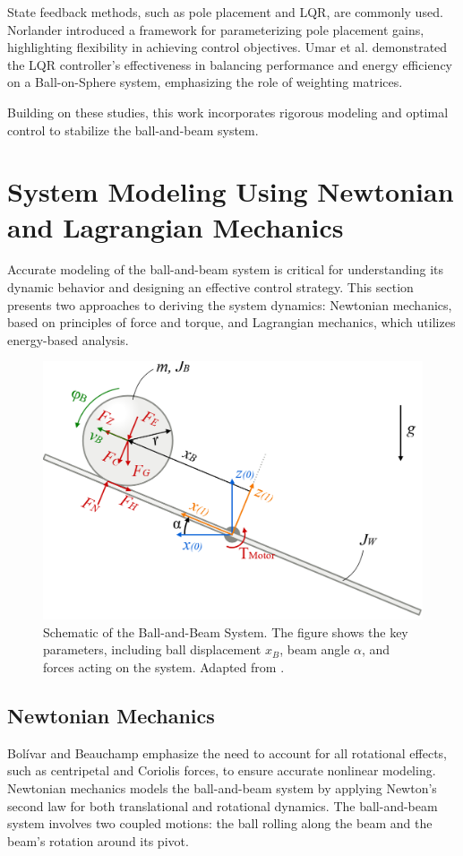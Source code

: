 \documentclass[conference]{IEEEtran}
\begin{document}
State feedback methods, such as pole placement and LQR, are commonly used. Norlander \cite{norlaner2003} introduced a framework for parameterizing pole placement gains, highlighting flexibility in achieving control objectives. Umar et al. \cite{umar2022} demonstrated the LQR controller's effectiveness in balancing performance and energy efficiency on a Ball-on-Sphere system, emphasizing the role of weighting matrices.

Building on these studies, this work incorporates rigorous modeling and optimal control to stabilize the ball-and-beam system.


\section{System Modeling Using Newtonian and Lagrangian Mechanics}
\label{sec:modeling}
Accurate modeling of the ball-and-beam system is critical for understanding its dynamic behavior and designing an effective control strategy. This section presents two approaches to deriving the system dynamics: Newtonian mechanics, based on principles of force and torque, and Lagrangian mechanics, which utilizes energy-based analysis.

\begin{figure}[H]
    \centering
    \includegraphics[width=0.8\linewidth]{Figures/system_diag_wiki_right.PNG}
    \caption{Schematic of the Ball-and-Beam System. The figure shows the key parameters, including ball displacement \(x_B\), beam angle \(\alpha\), and forces acting on the system. Adapted from \cite{mager2015}.}
    \label{fig:ball_beam_schematic}
\end{figure}


\subsection{Newtonian Mechanics}
Bolívar and Beauchamp \cite{bolivar2014} emphasize the need to account for all rotational effects, such as centripetal and Coriolis forces, to ensure accurate nonlinear modeling.
\label{subsec:model_newtonian}
Newtonian mechanics models the ball-and-beam system by applying Newton's second law for both translational and rotational dynamics. The ball-and-beam system involves two coupled motions: the ball rolling along the beam and the beam's rotation around its pivot.
\end{document}

